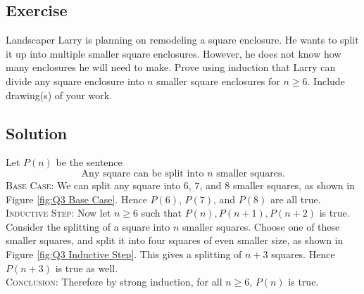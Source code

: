 \documentclass{article}
\newcounter{counter}
\newcommand{\Exercise}{Exercise \stepcounter{counter}\thecounter}
\begin{document}
\subsection*{\Exercise}
    Landscaper Larry is planning on remodeling a square enclosure. He wants to split it up into multiple smaller square enclosures. However, he does not know how many enclosures he will need to make. Prove using induction that Larry can divide any square enclosure into $n$ smaller square enclosures for $n \ge 6$. Include drawing(s) of your work.

\subsection*{Solution}
    Let $P(n)$ be the sentence $$\text{Any square can be split into $n$ smaller squares.}$$
    \textsc{Base Case}: We can split any square into $6$, $7$, and $8$ smaller squares, as shown in Figure \ref{fig:Q3 Base Case}. Hence $P(6)$, $P(7)$, and $P(8)$ are all true. \\
    \textsc{Inductive Step}: Now let $n \ge 6$ such that $P(n), P(n + 1), P(n + 2)$ is true. Consider the splitting of a square into $n$ smaller squares. Choose one of these smaller squares, and split it into four squares of even smaller size, as shown in Figure \ref{fig:Q3 Inductive Step}. This gives a splitting of $n + 3$ squares. Hence $P(n + 3)$ is true as well. \\
    \textsc{Conclusion}: Therefore by strong induction, for all $n \ge 6$, $P(n)$ is true.
    
    \newcommand{\backgroundcolor}{ForestGreen}
    \newcommand{\fibrecolor}{ForestGreen!90!black}
    
\end{document}
